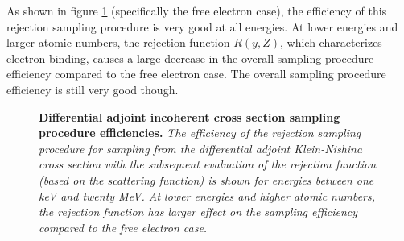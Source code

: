 As shown in figure \ref{fig:diff_adj_incoh_sampling_proc_eff} (specifically the 
free electron case), the efficiency of this rejection sampling procedure is very
good at all energies. At lower energies and larger atomic numbers, the rejection
function $R(y,Z)$, which characterizes electron binding, causes a large decrease
in the overall sampling procedure efficiency compared to the free electron case.
The overall sampling procedure efficiency is still very good though.
\begin{figure}[t!]
  \begin{center}
  \end{center}
  \caption{\textbf{Differential adjoint incoherent cross section sampling procedure efficiencies.}
    \textit{The efficiency of the rejection sampling procedure for sampling 
      from the differential adjoint Klein-Nishina cross section with the 
      subsequent evaluation of the rejection function (based on the scattering 
      function) is shown for energies between one keV and twenty MeV. At lower 
      energies and higher atomic numbers, the rejection function has larger 
      effect on the sampling efficiency compared to the free electron case.}}
  \label{fig:diff_adj_incoh_sampling_proc_eff}
\end{figure}

